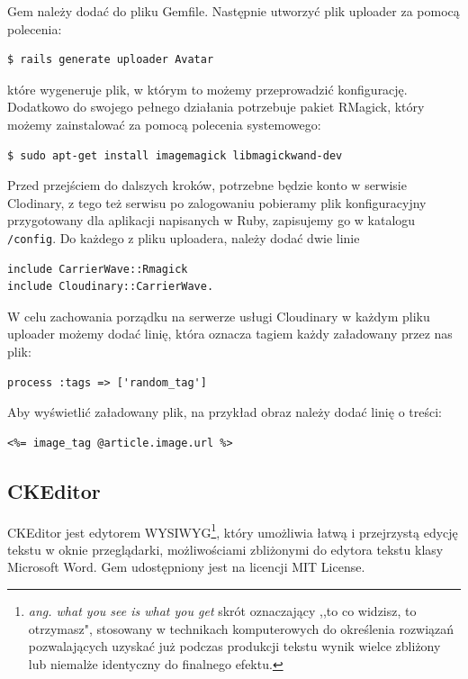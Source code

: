 \documentclass[openright]{xmgr}
\begin{document}
Gem należy dodać do pliku Gemfile. Następnie utworzyć plik uploader za pomocą polecenia:
\begin{lstlisting}[language=bashes, caption={Polecenie generujące plik uploader}]
$ rails generate uploader Avatar
\end{lstlisting}
które wygeneruje plik, w którym to możemy przeprowadzić konfigurację. Dodatkowo do swojego pełnego działania potrzebuje pakiet RMagick, który możemy zainstalować za pomocą polecenia systemowego:
\begin{lstlisting}[language=bashes, caption={Polecenie instalujące oprogramowanie RMagick}]
$ sudo apt-get install imagemagick libmagickwand-dev
\end{lstlisting}
Przed przejściem do dalszych kroków, potrzebne będzie konto w serwisie Clodinary, z tego też serwisu po zalogowaniu pobieramy plik konfiguracyjny przygotowany dla aplikacji napisanych w Ruby, zapisujemy go w katalogu \texttt{/config}. Do każdego z pliku uploadera, należy dodać dwie linie
\begin{lstlisting}[language=ruby2, caption={Fragment zawartości pliku uploader}]
include CarrierWave::Rmagick
include Cloudinary::CarrierWave.
\end{lstlisting}

\newpage

W celu zachowania porządku na serwerze usługi Cloudinary w każdym pliku uploader możemy dodać linię, która oznacza tagiem każdy załadowany przez nas plik:
\begin{lstlisting}[language=ruby2, caption={Przykładowy tag dla pliku}]
process :tags => ['random_tag']
\end{lstlisting}
Aby wyświetlić załadowany plik, na przykład obraz należy dodać linię o treści:
\begin{lstlisting}[language=ruby2, caption={Kod wyświetlający obraz}]
<%= image_tag @article.image.url %>
\end{lstlisting}

\subsection{CKEditor}
CKEditor \cite{ckeditor} jest edytorem WYSIWYG\footnote{\textit{ang. what you see is what you get} skrót oznaczający ,,to co widzisz, to otrzymasz", stosowany w technikach komputerowych do określenia rozwiązań pozwalających uzyskać już podczas produkcji tekstu wynik wielce zbliżony lub niemalże identyczny do finalnego efektu.}, który umożliwia łatwą i przejrzystą edycję tekstu w oknie przeglądarki, możliwościami zbliżonymi do edytora tekstu klasy Microsoft Word. Gem udostępniony jest na licencji MIT License.
\end{document}
